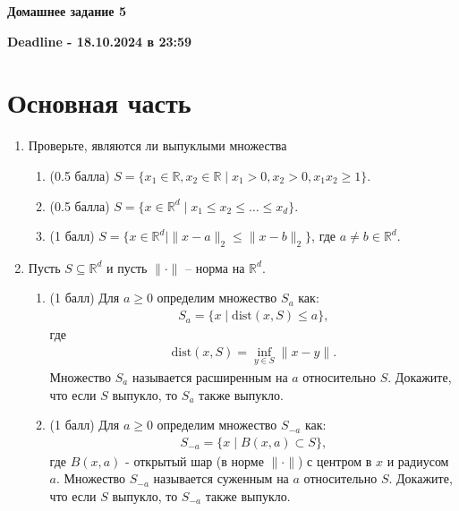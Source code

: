 \documentclass[a5paper,twoside,russian,8pt]{article}
\begin{document}
\begin{center}
    \textbf{Домашнее задание 5}
\end{center}
\begin{center}
    \textbf{Deadline - 18.10.2024 в 23:59}
\end{center}

\section*{Основная часть}
\begin{enumerate}[label=\textbf{Задача \arabic*.}]
\subsection*{Выпуклые множества}
\item Проверьте, являются ли выпуклыми множества 
    \begin{enumerate}
        \item (0.5 балла) $S = \{ x_1 \in \mathbb{R}, x_2 \in \mathbb{R} \mid x_1 > 0, x_2 > 0, x_1 x_2 \geq 1 \}$.

        \item (0.5 балла) $S = \{ x \in \mathbb{R}^d \mid x_1 \leq x_2 \leq \ldots \leq x_d \}$.

        \item (1 балл) $S = \{ x \in \mathbb{R}^d \mid  \| x - a\|_2 \leq \| x - b\|_2 \}$, где $a\neq b \in \mathbb{R}^d$.
    \end{enumerate}
    
    \item Пусть $ S \subseteq \mathbb{R}^d$ и пусть $\|\cdot\|$ -- норма на $\mathbb{R}^d$.
    \begin{enumerate}
        \item (1 балл) Для $a \geq 0$ определим множество $S_a$ как:
        \begin{align*}
            S_a = \{x \mid \text{dist}(x, S) \leq a \},
        \end{align*}
        где 
        \begin{align*}
            \text{dist}(x, S) = \inf_{y \in S} \| x - y \|.
        \end{align*}
        Множество $S_a$ называется расширенным на $a$ относительно $S$. Докажите, что если $S$ выпукло, то $S_a$ также выпукло.
        \item (1 балл) Для $a \geq 0$ определим множество $S_{-a}$ как:
        \begin{align*}
            S_{-a} = \{x \mid B(x, a) \subset S\},
        \end{align*}
        где $B(x, a)$ - открытый шар (в норме $\| \cdot \|$) с центром в $x$ и радиусом $a$. Множество $S_{-a}$ называется суженным на $a$ относительно $S$. Докажите, что если $S$ выпукло, то $S_{-a}$ также выпукло.
    \end{enumerate}


\end{enumerate}
\end{document}
